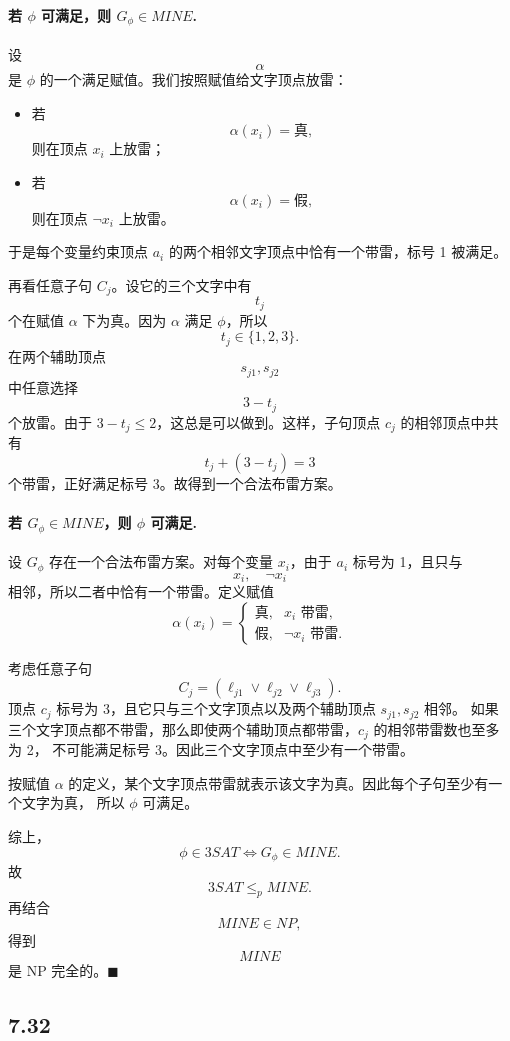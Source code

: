 \begin{answerred}
\paragraph{若 \(\phi\) 可满足，则 \(G_\phi\in MINE\).}
设
\[
\alpha
\]
是 $\phi$ 的一个满足赋值。我们按照赋值给文字顶点放雷：

\begin{itemize}
  \item 若
  \[
  \alpha(x_i)=\text{真},
  \]
  则在顶点 $x_i$ 上放雷；
  \item 若
  \[
  \alpha(x_i)=\text{假},
  \]
  则在顶点 $\neg x_i$ 上放雷。
\end{itemize}
于是每个变量约束顶点 $a_i$ 的两个相邻文字顶点中恰有一个带雷，标号 1 被满足。

再看任意子句 $C_j$。设它的三个文字中有
\[
t_j
\]
个在赋值 $\alpha$ 下为真。因为 $\alpha$ 满足 $\phi$，所以
\[
t_j\in\{1,2,3\}.
\]
在两个辅助顶点
\[
s_{j1},s_{j2}
\]
中任意选择
\[
3-t_j
\]
个放雷。由于 $3-t_j\le 2$，这总是可以做到。这样，子句顶点 $c_j$ 的相邻顶点中共有
\[
t_j+(3-t_j)=3
\]
个带雷，正好满足标号 3。故得到一个合法布雷方案。

\paragraph{若 \(G_\phi\in MINE\)，则 \(\phi\) 可满足.}
设 $G_\phi$ 存在一个合法布雷方案。对每个变量 $x_i$，由于 $a_i$ 标号为 1，且只与
\[
x_i,\quad \neg x_i
\]
相邻，所以二者中恰有一个带雷。定义赋值
\[
\alpha(x_i)=
\begin{cases}
\text{真}, & x_i \text{ 带雷},\\
\text{假}, & \neg x_i \text{ 带雷}.
\end{cases}
\]

考虑任意子句
\[
C_j=(\ell_{j1}\vee \ell_{j2}\vee \ell_{j3}).
\]
顶点 $c_j$ 标号为 3，且它只与三个文字顶点以及两个辅助顶点 $s_{j1},s_{j2}$ 相邻。
如果三个文字顶点都不带雷，那么即使两个辅助顶点都带雷，$c_j$ 的相邻带雷数也至多为 2，
不可能满足标号 3。因此三个文字顶点中至少有一个带雷。

按赋值 $\alpha$ 的定义，某个文字顶点带雷就表示该文字为真。因此每个子句至少有一个文字为真，
所以 $\phi$ 可满足。

\medskip
综上，
\[
\phi\in 3SAT
\iff
G_\phi\in MINE.
\]
故
\[
3SAT\le_p MINE.
\]
再结合
\[
MINE\in NP,
\]
得到
\[
MINE
\]
是 NP 完全的。$\blacksquare$

\end{answerred}
\subsection*{7.32}

